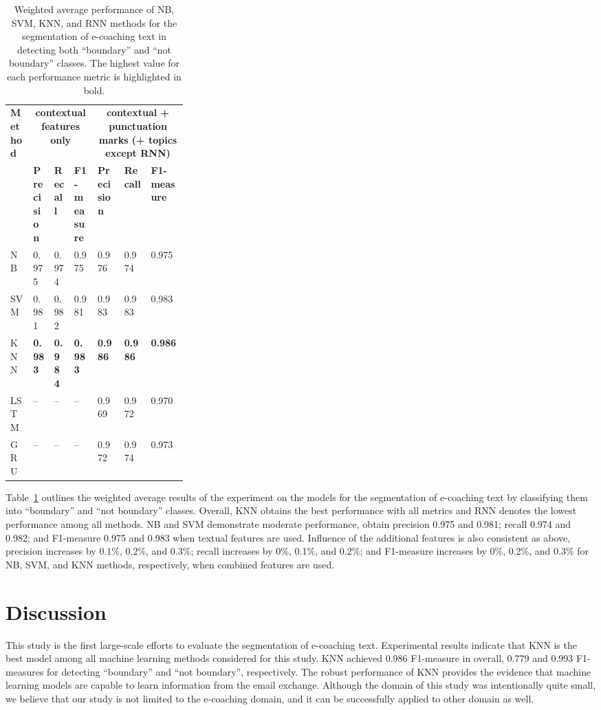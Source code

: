 \documentclass{amia}
\begin{document}
\begin{table}[ht]
\centering
\caption{Weighted average performance of NB, SVM, KNN, and RNN methods for the segmentation of e-coaching text in detecting both ``boundary'' and ``not boundary'' classes. The highest value for each performance metric is highlighted in bold.}
\label{tab:result_weighted_avg}
  \begin{tabular}{|l|l|l|l|p{0.15\linewidth}|p{0.15\linewidth}|l|}
  \hline
   \multirow{2}{*}{\textbf{Method}} & \multicolumn{3}{|c|}{\textbf{contextual features only}} & \multicolumn{3}{|c|}{\textbf{contextual + punctuation marks (+ topics except RNN)}} \\\cline{2-7}
   & \textbf{Precision}  & \textbf{Recall} & \textbf{F1-measure} & \textbf{Precision}  & \textbf{Recall} & \textbf{F1-measure}\\ \hline    
    
 NB & 0.975 & 0.974 & 0.975 & 0.976 & 0.974 & 0.975 \\ \hline
 SVM & 0.981 & 0.982 & 0.981 & 0.983 & 0.983 & 0.983\\ \hline
 KNN & \textbf{0.983} & \textbf{0.984} & \textbf{0.983} & \textbf{0.986} & \textbf{0.986} & \textbf{0.986}\\ \hline
 LSTM & -- & -- & -- & 0.969 & 0.972 & 0.970 \\ \hline
 GRU & -- & -- & -- & 0.972 & 0.974 & 0.973 \\ \hline 
  \end{tabular}
\end{table} 

Table~\ref{tab:result_weighted_avg} outlines the weighted average results of the experiment on the models for the segmentation of e-coaching text by classifying them into ``boundary'' and ``not boundary'' classes. Overall, KNN obtains the best performance with all metrics and RNN denotes the lowest performance among all methods. NB and SVM demonstrate moderate performance, obtain precision 0.975 and 0.981; recall 0.974 and 0.982; and F1-measure 0.975 and 0.983 when textual features are used. Influence of the additional features is also consistent as above, precision increases by 0.1\%, 0.2\%, and 0.3\%; recall increases by 0\%, 0.1\%, and 0.2\%; and F1-measure increases by 0\%, 0.2\%, and 0.3\% for NB, SVM, and KNN methods, respectively, when combined features are used.\\

\section*{Discussion}
This study is the first large-scale efforts to evaluate the segmentation of e-coaching text. Experimental results indicate that KNN is the best model among all machine learning methods considered for this study. KNN achieved 0.986 F1-measure in overall, 0.779 and 0.993 F1-measures for detecting ``boundary'' and ``not boundary'', respectively. The robust performance of KNN provides the evidence that machine learning models are capable to learn information from the email exchange. Although the domain of this study was intentionally quite small, we believe that our study is not limited to the e-coaching domain, and it can be successfully applied to other domain as well.
\end{document}
